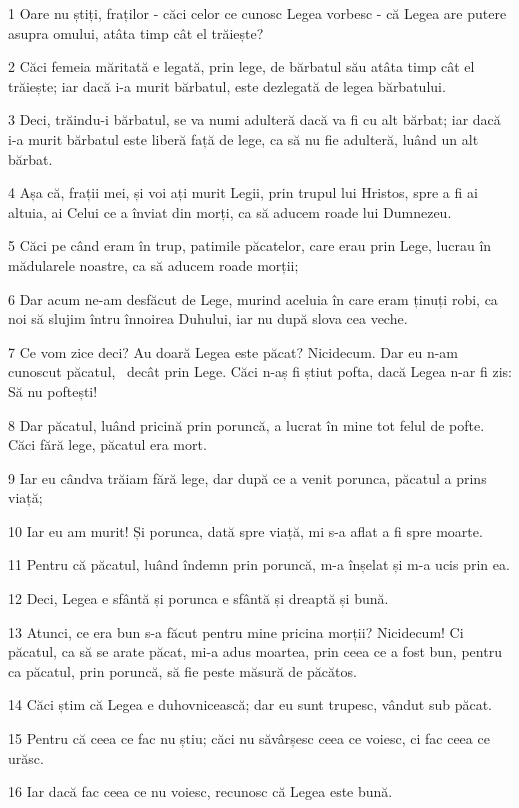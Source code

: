 \par 1 Oare nu știți, fraților - căci celor ce cunosc Legea vorbesc - că Legea are putere asupra omului, atâta timp cât el trăiește?
\par 2 Căci femeia măritată e legată, prin lege, de bărbatul său atâta timp cât el trăiește; iar dacă i-a murit bărbatul, este dezlegată de legea bărbatului.
\par 3 Deci, trăindu-i bărbatul, se va numi adulteră dacă va fi cu alt bărbat; iar dacă i-a murit bărbatul este liberă față de lege, ca să nu fie adulteră, luând un alt bărbat.
\par 4 Așa că, frații mei, și voi ați murit Legii, prin trupul lui Hristos, spre a fi ai altuia, ai Celui ce a înviat din morți, ca să aducem roade lui Dumnezeu.
\par 5 Căci pe când eram în trup, patimile păcatelor, care erau prin Lege, lucrau în mădularele noastre, ca să aducem roade morții;
\par 6 Dar acum ne-am desfăcut de Lege, murind aceluia în care eram ținuți robi, ca noi să slujim întru înnoirea Duhului, iar nu după slova cea veche.
\par 7 Ce vom zice deci? Au doară Legea este păcat? Nicidecum. Dar eu n-am cunoscut păcatul,  decât prin Lege. Căci n-aș fi știut pofta, dacă Legea n-ar fi zis: Să nu poftești!
\par 8 Dar păcatul, luând pricină prin poruncă, a lucrat în mine tot felul de pofte. Căci fără lege, păcatul era mort.
\par 9 Iar eu cândva trăiam fără lege, dar după ce a venit porunca, păcatul a prins viață;
\par 10 Iar eu am murit! Și porunca, dată spre viață, mi s-a aflat a fi spre moarte.
\par 11 Pentru că păcatul, luând îndemn prin poruncă, m-a înșelat și m-a ucis prin ea.
\par 12 Deci, Legea e sfântă și porunca e sfântă și dreaptă și bună.
\par 13 Atunci, ce era bun s-a făcut pentru mine pricina morții? Nicidecum! Ci păcatul, ca să se arate păcat, mi-a adus moartea, prin ceea ce a fost bun, pentru ca păcatul, prin poruncă, să fie peste măsură de păcătos.
\par 14 Căci știm că Legea e duhovnicească; dar eu sunt trupesc, vândut sub păcat.
\par 15 Pentru că ceea ce fac nu știu; căci nu săvârșesc ceea ce voiesc, ci fac ceea ce urăsc.
\par 16 Iar dacă fac ceea ce nu voiesc, recunosc că Legea este bună.
